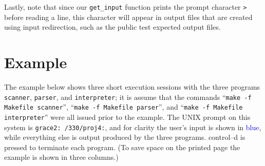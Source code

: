 \documentclass[11pt]{article}
\begin{document}
    Lastly, note that since our \texttt{get\_input} function prints the prompt
  character \texttt{>} before reading a line, this character will appear in
  output files that are created using input redirection, such as the public
  test expected output files.

  \section{Example}

    The example below shows three short execution sessions with the three
  programs \texttt{scanner}, \texttt{parser}, and \texttt{interpreter}; it
  is assume that the commands ``\texttt{make -f Makefile scanner}'',
  ``\texttt{make -f Makefile parser}'', and ``\texttt{make -f Makefile
  interpreter}'' were all issued prior to the example.  The UNIX prompt on
  this system is \texttt{grace2:\string~/330/proj4:}, and for clarity the
  user's input is shown in \textcolor{blue}{blue}, while everything else is
  output produced by the three programs.  control--d is pressed to terminate
  each program.  (To save space on the printed page the example is shown in
  three columns.)

    \vspace{-1mm}
\end{document}

